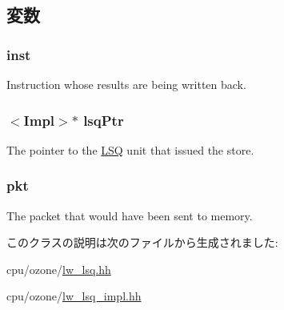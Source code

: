 \subsection{変数}
\hypertarget{classOzoneLWLSQ_1_1WritebackEvent_af5d4fb974eeb4507d4c837d365d0cefc}{
\subsubsection[{inst}]{ {\bf inst}}}
\label{classOzoneLWLSQ_1_1WritebackEvent_af5d4fb974eeb4507d4c837d365d0cefc}
Instruction whose results are being written back. \hypertarget{classOzoneLWLSQ_1_1WritebackEvent_a12f06bf70a86210f1df02ebe1b6d4d1a}{
\subsubsection[{lsqPtr}]{$<$Impl$>$$\ast$ {\bf lsqPtr}}}
\label{classOzoneLWLSQ_1_1WritebackEvent_a12f06bf70a86210f1df02ebe1b6d4d1a}
The pointer to the \hyperlink{classLSQ}{LSQ} unit that issued the store. \hypertarget{classOzoneLWLSQ_1_1WritebackEvent_a3a891bc2a0fcbe6be5297077d94e2df7}{
\subsubsection[{pkt}]{ {\bf pkt}}}
\label{classOzoneLWLSQ_1_1WritebackEvent_a3a891bc2a0fcbe6be5297077d94e2df7}
The packet that would have been sent to memory. 

このクラスの説明は次のファイルから生成されました:\begin{DoxyCompactItemize}
\item 
cpu/ozone/\hyperlink{lw__lsq_8hh}{lw\_\-lsq.hh}\item 
cpu/ozone/\hyperlink{lw__lsq__impl_8hh}{lw\_\-lsq\_\-impl.hh}\end{DoxyCompactItemize}
